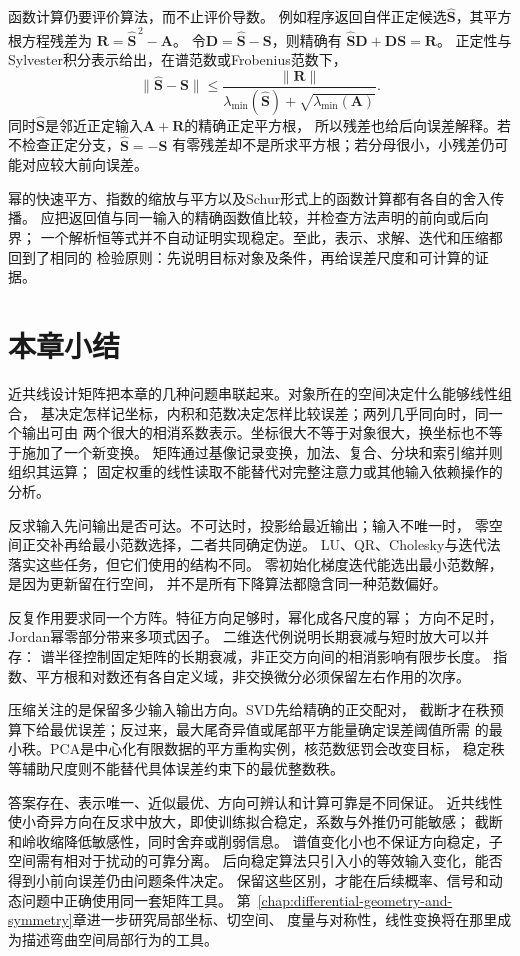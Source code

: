 函数计算仍要评价算法，而不止评价导数。
例如程序返回自伴正定候选$\widehat{\bm S}$，其平方根方程残差为
$\bm R=\widehat{\bm S}^{\,2}-\bm A$。
令$\bm D=\widehat{\bm S}-\bm S$，则精确有
$\widehat{\bm S}\bm D+\bm D\bm S=\bm R$。
正定性与Sylvester积分表示给出，在谱范数或Frobenius范数下，
\[
 \lVert\widehat{\bm S}-\bm S\rVert
 \leq\frac{\lVert\bm R\rVert}
 {\lambda_{\min}(\widehat{\bm S})+\sqrt{\lambda_{\min}(\bm A)}}.
\]
同时$\widehat{\bm S}$是邻近正定输入$\bm A+\bm R$的精确正定平方根，
所以残差也给后向误差解释。若不检查正定分支，$\widehat{\bm S}=-\bm S$
有零残差却不是所求平方根；若分母很小，小残差仍可能对应较大前向误差。

幂的快速平方、指数的缩放与平方以及Schur形式上的函数计算都有各自的舍入传播。
应把返回值与同一输入的精确函数值比较，并检查方法声明的前向或后向界；
一个解析恒等式并不自动证明实现稳定。至此，表示、求解、迭代和压缩都回到了相同的
检验原则：先说明目标对象及条件，再给误差尺度和可计算的证据。

\section{本章小结}
\label{sec:linear-algebra-summary}
\label{sec:matrix-analysis-summary}


近共线设计矩阵把本章的几种问题串联起来。对象所在的空间决定什么能够线性组合，
基决定怎样记坐标，内积和范数决定怎样比较误差；两列几乎同向时，同一个输出可由
两个很大的相消系数表示。坐标很大不等于对象很大，换坐标也不等于施加了一个新变换。
矩阵通过基像记录变换，加法、复合、分块和索引缩并则组织其运算；
固定权重的线性读取不能替代对完整注意力或其他输入依赖操作的分析。

反求输入先问输出是否可达。不可达时，投影给最近输出；输入不唯一时，
零空间正交补再给最小范数选择，二者共同确定伪逆。
LU、QR、Cholesky与迭代法落实这些任务，但它们使用的结构不同。
零初始化梯度迭代能选出最小范数解，是因为更新留在行空间，
并不是所有下降算法都隐含同一种范数偏好。

反复作用要求同一个方阵。特征方向足够时，幂化成各尺度的幂；
方向不足时，Jordan幂零部分带来多项式因子。
二维迭代例说明长期衰减与短时放大可以并存：
谱半径控制固定矩阵的长期衰减，非正交方向间的相消影响有限步长度。
指数、平方根和对数还有各自定义域，非交换微分必须保留左右作用的次序。

压缩关注的是保留多少输入输出方向。SVD先给精确的正交配对，
截断才在秩预算下给最优误差；反过来，最大尾奇异值或尾部平方能量确定误差阈值所需
的最小秩。PCA是中心化有限数据的平方重构实例，核范数惩罚会改变目标，
稳定秩等辅助尺度则不能替代具体误差约束下的最优整数秩。

答案存在、表示唯一、近似最优、方向可辨认和计算可靠是不同保证。
近共线性使小奇异方向在反求中放大，即使训练拟合稳定，系数与外推仍可能敏感；
截断和岭收缩降低敏感性，同时舍弃或削弱信息。
谱值变化小也不保证方向稳定，子空间需有相对于扰动的可靠分离。
后向稳定算法只引入小的等效输入变化，能否得到小前向误差仍由问题条件决定。
保留这些区别，才能在后续概率、信号和动态问题中正确使用同一套矩阵工具。
第~\ref{chap:differential-geometry-and-symmetry}章进一步研究局部坐标、切空间、
度量与对称性，线性变换将在那里成为描述弯曲空间局部行为的工具。

